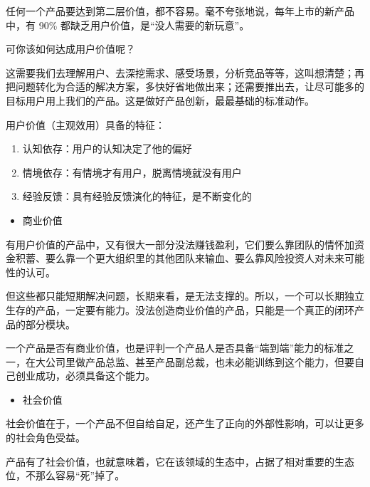 \documentclass[letterpaper,11pt,english]{sphinxmanual}
\begin{document}
任何一个产品要达到第二层价值，都不容易。毫不夸张地说，每年上市的新产品中，有
90\% 都缺乏用户价值，是“没人需要的新玩意”。

可你该如何达成用户价值呢？

这需要我们去理解用户、去深挖需求、感受场景，分析竞品等等，这叫想清楚；再把问题转化为合适的解决方案，多快好省地做出来；还需要推出去，让尽可能多的目标用户用上我们的产品。这是做好产品创新，最最基础的标准动作。

用户价值（主观效用）具备的特征：
%
\begin{footnote}[284]\sphinxAtStartFootnote
{}
%
\end{footnote}
\begin{enumerate}
%
\item {} 
认知依存：用户的认知决定了他的偏好

\item {} 
情境依存：有情境才有用户，脱离情境就没有用户

\item {} 
经验反馈：具有经验反馈演化的特征，是不断变化的

\end{enumerate}
\begin{itemize}
\item {} 
商业价值

\end{itemize}

有用户价值的产品中，又有很大一部分没法赚钱盈利，它们要么靠团队的情怀加资金积蓄、要么靠一个更大组织里的其他团队来输血、要么靠风险投资人对未来可能性的认可。

但这些都只能短期解决问题，长期来看，是无法支撑的。所以，一个可以长期独立生存的产品，一定要有能力。没法创造商业价值的产品，只能是一个真正的闭环产品的部分模块。

一个产品是否有商业价值，也是评判一个产品人是否具备“端到端”能力的标准之一，在大公司里做产品总监、甚至产品副总裁，也未必能训练到这个能力，但要自己创业成功，必须具备这个能力。
\begin{itemize}
\item {} 
社会价值

\end{itemize}

社会价值在于，一个产品不但自给自足，还产生了正向的外部性影响，可以让更多的社会角色受益。

产品有了社会价值，也就意味着，它在该领域的生态中，占据了相对重要的生态位，不那么容易“死”掉了。
\end{document}
